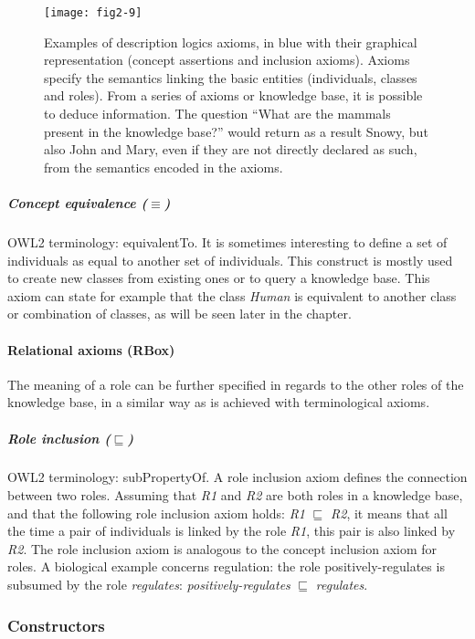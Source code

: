 \begin{figure}[ht]
    \centering
    \texttt{[image: fig2-9]}
    \caption{Examples of description logics axioms, in blue with their graphical representation (concept assertions and inclusion axioms). Axioms specify the semantics linking the basic entities (individuals, classes and roles). From a series of axioms or knowledge base, it is possible to deduce information. The question ``What are the mammals present in the knowledge base?'' would return as a result Snowy, but also John and Mary, even if they are not directly declared as such, from the semantics encoded in the axioms.}
    \label{fig2-9}
\end{figure}

\subparagraph{Concept equivalence ($ \equiv $)\\}
OWL2 terminology: equivalentTo. It is sometimes interesting to define a set of individuals as equal to another set of individuals. This construct is mostly used to create new classes from existing ones or to query a knowledge base. This axiom can state for example that the class \emph{Human} is equivalent to another class or combination of classes, as will be seen later in the chapter.

\paragraph{\textbf{Relational axioms (RBox)}\\}

The meaning of a role can be further specified in regards to the other roles of the knowledge base, in a similar way as is achieved with terminological axioms.

\subparagraph{Role inclusion ($ \sqsubseteq $)\\}
OWL2 terminology: subPropertyOf. A role inclusion axiom defines the connection between two roles. Assuming that \emph{R1} and \emph{R2} are both roles in a knowledge base, and that the following role inclusion axiom holds: \emph{R1} $ \sqsubseteq $ \emph{R2}, it means that all the time a pair of individuals is linked by the role \emph{R1}, this pair is also linked by \emph{R2}. The role inclusion axiom is analogous to the concept inclusion axiom for roles. A biological example concerns regulation: the role positively-regulates is subsumed by the role \emph{regulates}: \emph{positively-regulates} $ \sqsubseteq $ \emph{regulates}.

\subsubsection{Constructors}

